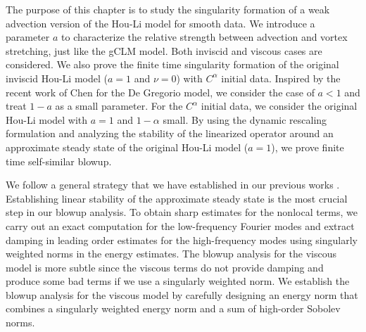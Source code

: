 \documentclass[12pt]{caltech_thesis}
\numberwithin{equation}{section}
\begin{document}
The purpose of this chapter is to study the singularity formation of a weak advection version of the Hou-Li model for smooth data. We introduce a parameter $a$ to characterize the relative strength between advection and vortex stretching, just like the gCLM model. Both inviscid and viscous cases are considered. We also prove the finite time singularity formation of the original inviscid Hou-Li model ($a=1$ and $\nu=0$) with $C^\alpha$ initial data. Inspired by the recent work of Chen \cite{chen2021regularity} for the De Gregorio model, we consider the case of $a < 1$ and treat $1-a$ as a small parameter. For the $C^\alpha$ initial data, we consider the original Hou-Li model with $a=1$ and $1-\alpha$ small. 
By using the dynamic rescaling formulation and analyzing the stability of the linearized operator around an approximate steady state of the original Hou-Li model ($a=1$), we prove finite time self-similar blowup. 

We follow a general strategy that we have established in our previous works \cite{chen2021finite,chen2019finite2}.
Establishing linear stability of the approximate steady state is the most crucial step in our blowup analysis. To obtain sharp estimates for the nonlocal terms, we carry out an exact computation for the low-frequency Fourier modes and {extract damping in leading order estimates}  for the high-frequency modes using singularly weighted norms {in the energy estimates}.  The blowup analysis for the viscous model is more subtle since the viscous terms do not provide damping and produce some bad terms if we use a singularly weighted norm. We establish the blowup analysis for the viscous model by carefully designing an energy norm that combines a singularly weighted energy norm and a {sum of} high-order Sobolev norms.
\end{document}
